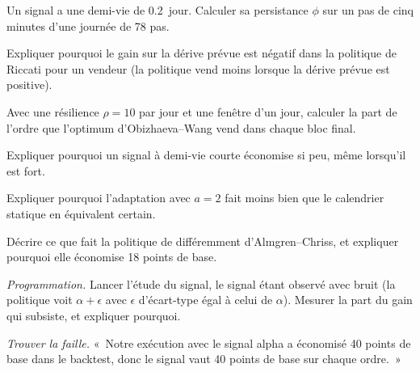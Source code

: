 \begin{exercise}[$\star$]\label{exo:mx:beyond-almgren-chriss:1}
Un signal a une demi-vie de 0.2~jour. Calculer sa persistance $\phi$ sur un pas de cinq minutes d'une journée de 78 pas.
\end{exercise}

\begin{exercise}[$\star$]\label{exo:mx:beyond-almgren-chriss:2}
Expliquer pourquoi le gain sur la dérive prévue est négatif dans la politique de Riccati pour un vendeur (la politique vend moins lorsque la dérive prévue est positive).
\end{exercise}

\begin{exercise}[$\star$]\label{exo:mx:beyond-almgren-chriss:3}
Avec une résilience $\rho=10$ par jour et une fenêtre d'un jour, calculer la part de l'ordre que l'optimum d'Obizhaeva--Wang vend dans chaque bloc final.
\end{exercise}

\begin{exercise}[$\star\star$]\label{exo:mx:beyond-almgren-chriss:4}
Expliquer pourquoi un signal à demi-vie courte économise si peu, même lorsqu'il est fort.
\end{exercise}

\begin{exercise}[$\star\star$]\label{exo:mx:beyond-almgren-chriss:5}
Expliquer pourquoi l'adaptation avec $a=2$ fait moins bien que le calendrier statique en équivalent certain.
\end{exercise}

\begin{exercise}[$\star\star$]\label{exo:mx:beyond-almgren-chriss:6}
Décrire ce que fait la politique de  différemment d'Almgren--Chriss, et expliquer pourquoi elle économise 18 points de base.
\end{exercise}

\begin{exercise}[$\star\star\star$]\label{exo:mx:beyond-almgren-chriss:7}
\emph{Programmation.} Lancer l'étude du signal, le signal étant observé avec bruit (la politique voit $\alpha+\epsilon$ avec $\epsilon$ d'écart-type égal à celui de
$\alpha$). Mesurer la part du gain qui subsiste, et expliquer pourquoi.
\end{exercise}

\begin{exercise}[$\star\star\star$]\label{exo:mx:beyond-almgren-chriss:8}
\emph{Trouver la faille.} «~Notre exécution avec le signal alpha a économisé 40 points de base dans le backtest, donc le signal vaut 40 points de base sur chaque ordre.~»
\end{exercise}

